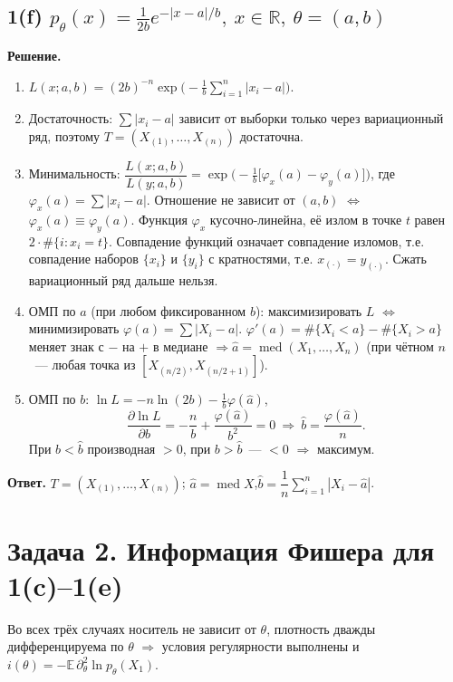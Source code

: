 \documentclass[12pt,a4paper]{article}
\newcommand{\E}{\mathbb{E}}
\newcommand{\sol}{\par\noindent\textbf{Решение.} }
\newcommand{\ans}{\par\smallskip\noindent\textbf{Ответ.} }
\begin{document}
\subsection*{1(f) \quad $p_\theta(x)=\frac1{2b}e^{-|x-a|/b},\ x\in\mathbb R,\ \theta=(a,b)$}
\sol
\begin{enumerate}
  \item $L(x;a,b)=(2b)^{-n}\exp\Big(-\frac1b\sum_{i=1}^n|x_i-a|\Big)$.
  \item Достаточность: $\sum|x_i-a|$ зависит от выборки только через
        вариационный ряд, поэтому $T=(X_{(1)},\dots,X_{(n)})$ достаточна.
  \item Минимальность: $\dfrac{L(x;a,b)}{L(y;a,b)}
        =\exp\Big(-\frac1b\big[\varphi_x(a)-\varphi_y(a)\big]\Big)$,
        где $\varphi_x(a)=\sum|x_i-a|$.
        Отношение не зависит от $(a,b)$ $\iff$ $\varphi_x(a)\equiv\varphi_y(a)$.
        Функция $\varphi_x$ кусочно-линейна, её излом в точке $t$ равен
        $2\cdot\#\{i:x_i=t\}$. Совпадение функций означает совпадение изломов,
        т.е. совпадение наборов $\{x_i\}$ и $\{y_i\}$ с кратностями,
        т.е. $x_{(\cdot)}=y_{(\cdot)}$. Сжать вариационный ряд дальше нельзя.
  \item ОМП по $a$ (при любом фиксированном $b$): максимизировать $L$
        $\iff$ минимизировать $\varphi(a)=\sum|X_i-a|$.
        $\varphi'(a)=\#\{X_i<a\}-\#\{X_i>a\}$ меняет знак с $-$ на $+$ в медиане
        $\Rightarrow\hat a=\operatorname{med}(X_1,\dots,X_n)$
        (при чётном $n$~--- любая точка из $[X_{(n/2)},X_{(n/2+1)}]$).
  \item ОМП по $b$: $\ln L=-n\ln(2b)-\frac1b\varphi(\hat a)$,
  \[
    \frac{\partial\ln L}{\partial b}=-\frac nb+\frac{\varphi(\hat a)}{b^2}=0
    \ \Rightarrow\ \hat b=\frac{\varphi(\hat a)}{n}.
  \]
  При $b<\hat b$ производная $>0$, при $b>\hat b$~--- $<0$ $\Rightarrow$ максимум.
\end{enumerate}
\ans $T=(X_{(1)},\dots,X_{(n)})$;\quad
$\hat a=\operatorname{med}X$,\quad $\hat b=\dfrac1n\sum_{i=1}^n|X_i-\hat a|$.

\section*{Задача 2. Информация Фишера для 1(c)--1(e)}

Во всех трёх случаях носитель не зависит от $\theta$, плотность дважды
дифференцируема по $\theta$ $\Rightarrow$ условия регулярности выполнены и
$i(\theta)=-\E\,\partial^2_\theta\ln p_\theta(X_1)$.
\end{document}
